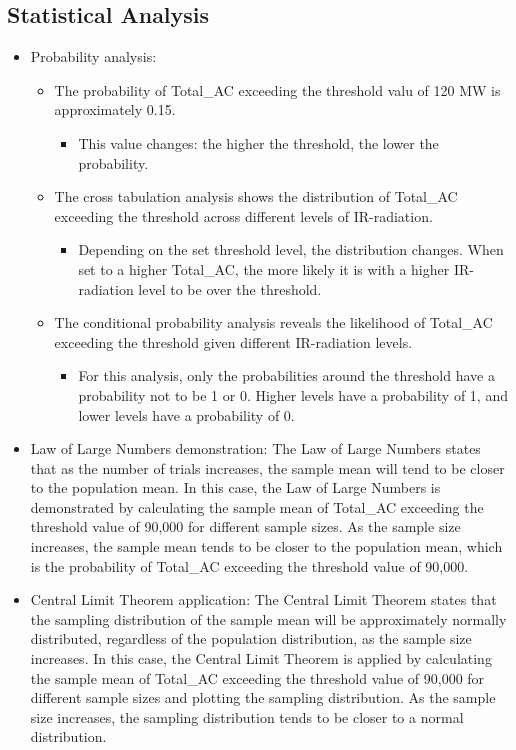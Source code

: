 \documentclass[10pt]{article}
\begin{document}
\subsection{Statistical Analysis}
\begin{itemize}
    \item Probability analysis: 
    \begin{itemize}
        \item The probability of Total\_AC exceeding the threshold valu of 120 MW is approximately 0.15.
    \begin{itemize}
        \item This value changes: the higher the threshold, the lower the probability.
    \end{itemize}
    \item The cross tabulation analysis shows the distribution of Total\_AC exceeding the threshold across different levels of IR-radiation.
    \begin{itemize}
        \item Depending on the set threshold level, the distribution changes. When set to a higher Total\_AC, the more likely it is with a higher IR-radiation level to be over the threshold.
    \end{itemize}
    \item The conditional probability analysis reveals the likelihood of Total\_AC exceeding the threshold given different IR-radiation levels.
    \begin{itemize}
        \item For this analysis, only the probabilities around the threshold have a probability not to be 1 or 0. Higher levels have a probability of 1, and lower levels have a probability of 0.
    \end{itemize}
\end{itemize}
    \item Law of Large Numbers demonstration: The Law of Large Numbers states that as the number of trials increases, the sample mean will tend to be closer to the population mean. In this case, the Law of Large Numbers is demonstrated by calculating the sample mean of Total\_AC exceeding the threshold value of 90,000 for different sample sizes. As the sample size increases, the sample mean tends to be closer to the population mean, which is the probability of Total\_AC exceeding the threshold value of 90,000.
    \item Central Limit Theorem application: The Central Limit Theorem states that the sampling distribution of the sample mean will be approximately normally distributed, regardless of the population distribution, as the sample size increases. In this case, the Central Limit Theorem is applied by calculating the sample mean of Total\_AC exceeding the threshold value of 90,000 for different sample sizes and plotting the sampling distribution. As the sample size increases, the sampling distribution tends to be closer to a normal distribution.

\end{itemize}
\end{document}

